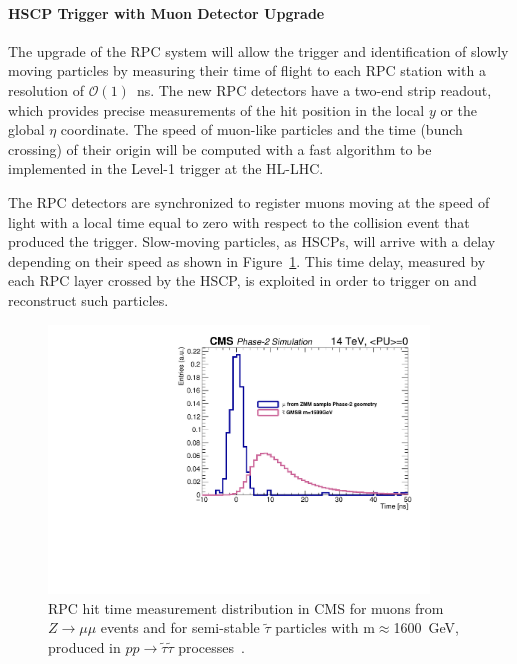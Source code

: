 \paragraph{HSCP Trigger with Muon Detector Upgrade}

The upgrade of the RPC system will allow the trigger and identification of slowly moving particles by measuring their time of flight to each RPC station with a resolution of $\mathcal{O}(1)$~ns. The new RPC detectors have a two-end strip readout, which provides precise measurements of the hit position in the local $y$ or the global $\eta$ coordinate. The speed of muon-like particles and the time (bunch crossing) of their origin will be computed with a fast algorithm to be implemented in the Level-1 trigger at the HL-LHC.

The RPC detectors are synchronized to register muons moving at the speed of light with a local time equal to zero with respect to the collision event that produced the trigger. Slow-moving particles, as HSCPs, will arrive with a delay depending on their speed as shown in Figure~\ref{fig:hscp_time}. This time delay, measured by each RPC layer crossed by the HSCP, is exploited in order to trigger on and reconstruct such particles.

\begin{figure}[t]
\begin{center}
  \includegraphics[width=0.9\textwidth]{figures/HSCP/time.pdf}
  \caption{RPC hit time measurement distribution in CMS for muons from $Z \to \mu\mu$ events and for semi-stable $\tilde \tau$ particles with m$\approx$1600~GeV, produced in $pp \to \tilde \tau \tilde \tau$ processes~\cite{Lourenco:2283189}.}
  \label{fig:hscp_time}
\end{center}
\end{figure}

